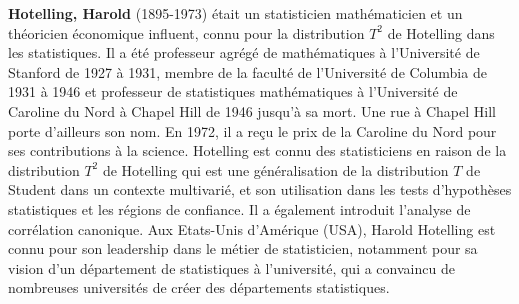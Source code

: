 \textbf{Hotelling, Harold} (1895-1973) était un statisticien mathématicien et un théoricien économique influent, connu pour la distribution $T^2$ de Hotelling dans les statistiques. Il a été professeur agrégé de mathématiques à l'Université de Stanford de 1927 à 1931, membre de la faculté de l'Université de Columbia de 1931 à 1946 et professeur de statistiques mathématiques à l'Université de Caroline du Nord à Chapel Hill de 1946 jusqu'à sa mort. Une rue à Chapel Hill porte d'ailleurs son nom. En 1972, il a reçu le prix de la Caroline du Nord pour ses contributions à la science. Hotelling est connu des statisticiens en raison de la distribution $T^2$ de Hotelling qui est une généralisation de la distribution $T$ de Student dans un contexte multivarié, et son utilisation dans les tests d'hypothèses statistiques et les régions de confiance. Il a également introduit l'analyse de corrélation canonique. Aux Etats-Unis d'Amérique (USA), Harold Hotelling est connu pour son leadership dans le métier de statisticien, notamment pour sa vision d'un département de statistiques à l'université, qui a convaincu de nombreuses universités de créer des départements statistiques.

